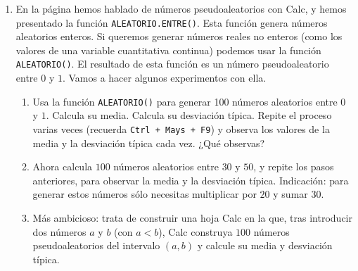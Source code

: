 \documentclass[10pt,a4paper]{article}\usepackage[]{graphicx}\usepackage[]{color}
\newcounter {cont01}
\begin{document}
\begin{enumerate}
  \item En la página \pageref{tut01:subsubsec:NumerosAleatoriosCalc} hemos hablado de números pseudoaleatorios con Calc, y hemos presentado la función {\tt ALEATORIO.ENTRE()}. Esta función genera números aleatorios enteros. Si queremos generar números reales no enteros (como los valores de una variable cuantitativa continua) podemos usar la función {\tt ALEATORIO()}. El resultado de esta función es un número pseudoaleatorio entre $0$ y $1$. Vamos a hacer algunos experimentos con ella.
      \begin{enumerate}
        \item Usa la función {\tt ALEATORIO()} para generar 100 números aleatorios entre $0$ y $1$. Calcula su media. Calcula su desviación típica. Repite el proceso varias veces (recuerda {\tt Ctrl + Mays + F9}) y observa los valores de la media y la desviación típica cada vez. ¿Qué observas?
        \item Ahora calcula $100$ números aleatorios entre $30$ y $50$, y repite los pasos anteriores, para observar la media y la desviación típica. Indicación: para generar estos números sólo necesitas multiplicar por $20$ y sumar $30$.
        \item Más ambicioso: trata de construir una hoja Calc en la que, tras introducir dos números $a$ y $b$ (con $a < b$), Calc construya $100$ números pseudoaleatorios del intervalo $(a,b)$ y calcule su media y desviación típica.
      \end{enumerate}


\end{enumerate}
\end{document}
